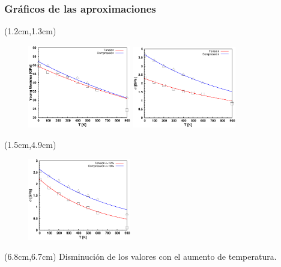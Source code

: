 \begin{frame}
 \frametitle{Gr\'aficos de las aproximaciones}
 \begin{textblock*}{10cm}(1.2cm,1.3cm)
 \begin{figure}[htp]
    \centering
    \includegraphics[width=4.5cm]{Presentacion_Mecom_2012/young_T_both.eps}
    \includegraphics[width=4.5cm]{Presentacion_Mecom_2012/peakstress_T_BOTH.eps}
  \end{figure} 
 \end{textblock*}
 \begin{textblock*}{5cm}(1.5cm,4.9cm)
   \begin{figure}[htp]
    \centering
    \includegraphics[width=4.5cm]{Presentacion_Mecom_2012/defstress_T_BOTH.eps}
  \end{figure} 
 \end{textblock*}
 \begin{textblock*}{5cm}(6.8cm,6.7cm)
  \centering
   Disminuci\'on de los valores con el aumento de temperatura.
  \end{textblock*}
\end{frame}

